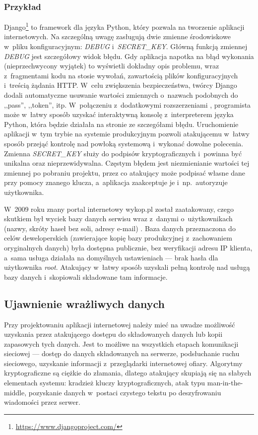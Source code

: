 \documentclass[12pt,a4paper,polish,thesis]{dcsbook}
\begin{document}
\subsubsection*{Przykład}
Django\footnote{\url{https://www.djangoproject.com/}} to framework dla języka Python, który pozwala na tworzenie aplikacji internetowych. Na szczególną uwagę zasługują dwie zmienne środowiskowe w~pliku konfiguracyjnym: \textit{DEBUG} i~\textit{SECRET\_KEY}. Główną funkcją zmiennej \textit{DEBUG} jest szczegółowy widok błędu. Gdy aplikacja napotka na błąd wykonania (nieprzechwycony wyjątek) to wyświetli dokładny opis problemu, wraz z~fragmentami kodu na stosie wywołań, zawartością plików konfiguracyjnych i~treścią żądania HTTP. W~celu zwiększenia bezpieczeństwa, twórcy Django dodali automatyczne usuwanie wartości zmiennych o~nazwach podobnych do ,,pass'', ,,token'', itp. W~połączeniu z~dodatkowymi rozszerzeniami \cite{werkzeug}, programista może w~łatwy sposób uzyskać interaktywną konsolę z~interpreterem języka Python, która będzie działała na stronie ze szczegółami błędu. Uruchomienie aplikacji w~tym trybie na systemie produkcyjnym pozwoli atakującemu w~łatwy sposób przejąć kontrolę nad powłoką systemową i~wykonać dowolne polecenia. Zmienna \textit{SECRET\_KEY} służy do podpisów kryptograficznych i~powinna być unikalna oraz nieprzewidywalna. Częstym błędem jest niezmienianie wartości tej zmiennej po pobraniu projektu, przez co atakujący może podpisać własne dane przy pomocy znanego klucza, a~aplikacja zaakceptuje je i~np.~autoryzuje użytkownika.

 W~2009 roku znany portal internetowy wykop.pl został zaatakowany, czego skutkiem był wyciek bazy danych serwisu wraz z~danymi o~użytkownikach (nazwy, skróty haseł bez soli, adresy e-mail) \cite{wykop}. Baza danych przeznaczona do celów deweloperskich (zawierające kopię bazy produkcyjnej z~zachowaniem oryginalnych danych) była dostępna publicznie, bez weryfikacji adresu IP klienta, a~sama usługa działała na domyślnych ustawieniach --- brak hasła dla użytkownika \textit{root}. Atakujący w~łatwy sposób uzyskali pełną kontrolę nad usługą bazy danych i~skopiowali składowane tam informacje.

\subsection{Ujawnienie wrażliwych danych}
Przy projektowaniu aplikacji internetowej należy mieć na uwadze możliwość uzyskania przez atakującego dostępu do składowanych danych lub kopii zapasowych tych danych. Jest to możliwe na wszystkich etapach komunikacji sieciowej --- dostęp do danych składowanych na serwerze, podsłuchanie ruchu sieciowego, uzyskanie informacji z~przeglądarki internetowej ofiary. Algorytmy kryptograficzne są ciężkie do złamania, dlatego atakujący skupiają się na słabych elementach systemu: kradzież kluczy kryptograficznych, atak typu man-in-the-middle, pozyskanie danych w~postaci czystego tekstu po deszyfrowaniu wiadomości przez serwer.
\end{document}
